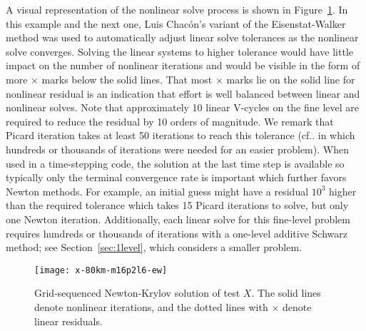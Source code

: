 \documentclass[final]{siamltex}
\makeatletter
\newcommand{\citep}[1]{{\cite{#1}}}
\DeclareRobustCommand\onedot{\futurelet\@let@token\@onedot}
\def\@onedot{\ifx\@let@token.\else.\null\fi\xspace}
\makeatother
\begin{document}
A visual representation of the nonlinear solve process is shown in Figure~\ref{fig:xgridseq}.
In this example and the next one, Luis Chac\'on's variant of the Eisenstat-Walker~\citep{eisenstat1996cft} method was used to automatically adjust linear solve tolerances as the nonlinear solve converges.  Solving the linear systems to higher tolerance would have little impact on the number of nonlinear iterations and would be visible in the form of more $\times$ marks below the solid lines.  That most $\times$ marks lie on the solid line for nonlinear residual is an indication that effort is well balanced between linear and nonlinear solves.
Note that approximately 10 linear V-cycles on the fine level are required to reduce the residual by 10 orders of magnitude.
We remark that Picard iteration takes at least 50 iterations to reach this tolerance (cf\onedot \cite{desmedt2010using} in which hundreds or thousands of iterations were needed for an easier problem).
When used in a time-stepping code, the solution at the last time step is available so typically only the terminal convergence rate is important which further favors Newton methods.
For example, an initial guess might have a residual $10^3$ higher than the required tolerance which takes 15 Picard iterations to solve, but only one Newton iteration.
Additionally, each linear solve for this fine-level problem requires hundreds or thousands of iterations with a one-level additive Schwarz method; see Section~\ref{sec:1level}, which considers a smaller problem.

\begin{figure}
  \centering\texttt{[image: x-80km-m16p2l6-ew]}
  \caption{Grid-sequenced Newton-Krylov solution of test $X$.  The solid lines denote nonlinear iterations, and the dotted lines with $\times$ denote linear residuals.}\label{fig:xgridseq}
\end{figure}
\end{document}
